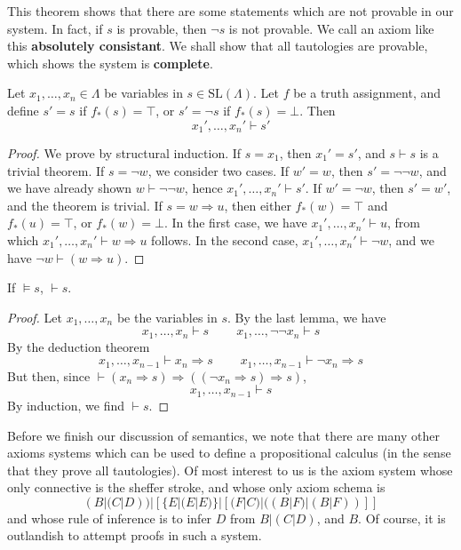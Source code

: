 This theorem shows that there are some statements which are not provable in our system. In fact, if $s$ is provable, then $\neg s$ is not provable. We call an axiom like this {\bf absolutely consistant}. We shall show that all tautologies are provable, which shows the system is {\bf complete}.

\begin{lemma}
    Let $x_1, \dots, x_n \in \Lambda$ be variables in $s \in \text{SL}(\Lambda)$. Let $f$ be a truth assignment, and define $s' = s$ if $f_*(s) = \top$, or $s' = \neg s$ if $f_*(s) = \bot$. Then
    \[ x_1', \dots, x_n' \vdash s' \]
\end{lemma}
\begin{proof}
    We prove by structural induction. If $s = x_1$, then $x_1' = s'$, and $s \vdash s$ is a trivial theorem. If $s = \neg w$, we consider two cases. If $w' = w$, then $s' = \neg \neg w$, and we have already shown $w \vdash \neg \neg w$, hence $x_1', \dots, x_n' \vdash s'$. If $w' = \neg w$, then $s' = w'$, and the theorem is trivial. If $s = w \Rightarrow u$, then either $f_*(w) = \top$ and $f_*(u) = \top$, or $f_*(w) = \bot$. In the first case, we have $x_1', \dots, x_n' \vdash u$, from which $x_1', \dots, x_n' \vdash w \Rightarrow u$ follows. In the second case, $x_1', \dots, x_n' \vdash \neg w$, and we have $\neg w \vdash (w \Rightarrow u)$.
\end{proof}

\begin{corollary}
    If $\vDash s$, $\vdash s$.
\end{corollary}
\begin{proof}
    Let $x_1, \dots, x_n$ be the variables in $s$. By the last lemma, we have
    \[ x_1, \dots, x_n \vdash s\ \ \ \ \ \ \ \ \ \ x_1, \dots, \neg \neg x_n \vdash s \]
    By the deduction theorem
    \[ x_1, \dots, x_{n-1} \vdash x_n \Rightarrow s\ \ \ \ \ \ \ \ \ \ x_1, \dots, x_{n-1} \vdash \neg x_n \Rightarrow s \]
    But then, since $\vdash (x_n \Rightarrow s) \Rightarrow ((\neg x_n \Rightarrow s) \Rightarrow s)$,
    \[ x_1, \dots, x_{n-1} \vdash s \]
    By induction, we find $\vdash s$.
\end{proof}

Before we finish our discussion of semantics, we note that there are many other axioms systems which can be used to define a propositional calculus (in the sense that they prove all tautologies). Of most interest to us is the axiom system whose only connective is the sheffer stroke, and whose only axiom schema is
%
\[ (B|(C|D))|[\{E|(E|E)\}|[(F|C)|((B|F)|(B|F))]] \]
%
and whose rule of inference is to infer $D$ from $B|(C|D)$, and $B$. Of course, it is outlandish to attempt proofs in such a system.

